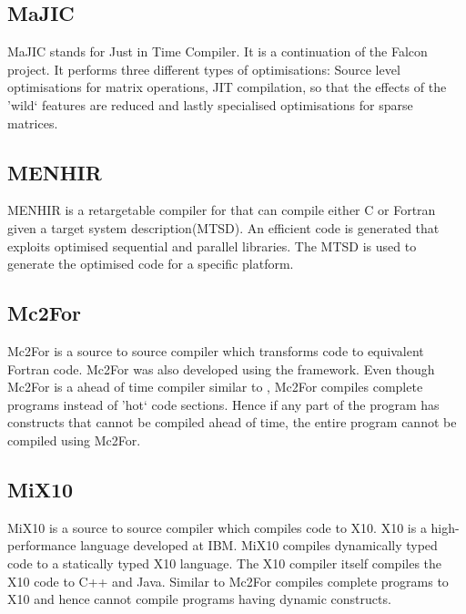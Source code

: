 \subsection{MaJIC}
MaJIC\cite{Almasi:2002:MCM:543552.512564} stands for \matlab Just in Time Compiler. It is a continuation of the Falcon project. It performs three different types of optimisations: Source level optimisations for matrix operations, JIT compilation, so that the effects of the 'wild` \matlab features are reduced and lastly specialised optimisations for sparse matrices. 
\subsection{MENHIR}
MENHIR\cite{Chauveau:1999} is a retargetable compiler for \matlab that can compile either C or Fortran given a target system description(MTSD). An efficient code is generated that exploits optimised sequential and parallel libraries. The MTSD is used to generate the optimised code for a specific platform. 
\subsection{Mc2For}
Mc2For\cite{Li:2014} is a source to source compiler which transforms \matlab code to equivalent Fortran code. Mc2For was also developed using the \mclab framework. Even though Mc2For is a ahead of time compiler similar to \velocty, Mc2For compiles complete \matlab programs instead of 'hot` code sections. Hence if any part of the \matlab program has constructs that cannot be compiled ahead of time, the entire program cannot be compiled using Mc2For. 
\subsection{MiX10}
MiX10\cite{vkumar14} is a source to source compiler which compiles \matlab code to X10\cite{x10}. X10 is a high-performance language developed at IBM. MiX10 compiles dynamically typed \matlab code to a statically typed X10 language. The X10 compiler itself compiles the X10 code to C++ and Java. Similar to Mc2For compiles complete \matlab programs to X10 and hence cannot compile \matlab programs having dynamic constructs.


